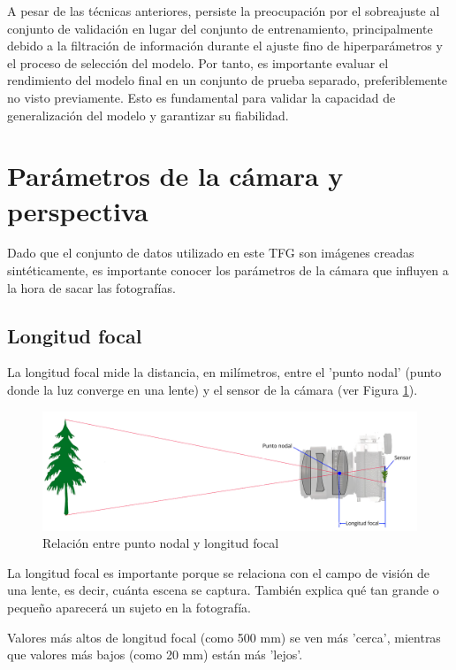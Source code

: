 A pesar de las técnicas anteriores, persiste la preocupación por el sobreajuste al conjunto de validación en lugar del conjunto de entrenamiento, principalmente debido a la filtración de información durante el ajuste fino de hiperparámetros y el proceso de selección del modelo. Por tanto, es importante evaluar el rendimiento del modelo final en un conjunto de prueba separado, preferiblemente no visto previamente. Esto es fundamental para validar la capacidad de generalización del modelo y garantizar su fiabilidad.


\section{Parámetros de la cámara y perspectiva}

Dado que el conjunto de datos utilizado en este TFG son imágenes creadas sintéticamente, es importante conocer los parámetros de la cámara que influyen a la hora de sacar las fotografías.

\subsection*{Longitud focal}
La longitud focal \cite{44} mide la distancia, en milímetros, entre el 'punto nodal' (punto donde la luz converge en una lente) y el sensor de la cámara (ver Figura \ref{fig11}). 

\begin{figure}[h]
	\centering
	\includegraphics[scale=0.2]{imagenes/cap2/focal.png}
	\caption[Relación entre punto nodal y longitud focal.]{Relación entre punto nodal y longitud focal \cite{44}}
	\label{fig11}
\end{figure}

La longitud focal es importante porque se relaciona con el campo de visión de una lente, es decir, cuánta escena se captura. También explica qué tan grande o pequeño aparecerá un sujeto en la fotografía.

Valores más altos de longitud focal (como 500 mm) se ven más 'cerca', mientras que valores más bajos (como 20 mm) están más 'lejos'.

